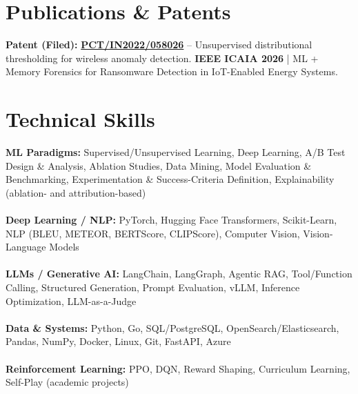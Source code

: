 \documentclass[letterpaper,11pt]{article}
\begin{document}
\section{Publications \& Patents}
\resumeSubHeadingListStart
\resumeProjectHeading
{\textbf{Patent (Filed):} \href{https://patents.justia.com/inventor/vedaang-chopra}{\textbf{PCT/IN2022/058026}} -- Unsupervised distributional thresholding for wireless anomaly detection.}{}
\resumeProjectHeading
{\textbf{IEEE ICAIA 2026} \;|\; ML + Memory Forensics for Ransomware Detection in IoT-Enabled Energy Systems.}{}
\resumeSubHeadingListEnd

\section{Technical Skills}
\footnotesize
\textbf{ML Paradigms:} Supervised/Unsupervised Learning, Deep Learning, A/B Test Design \& Analysis, Ablation
Studies, Data Mining, Model Evaluation \& Benchmarking, Experimentation \& Success-Criteria Definition,
Explainability (ablation- and attribution-based) \\\\[1pt]
\textbf{Deep Learning / NLP:} PyTorch, Hugging Face Transformers, Scikit-Learn, NLP (BLEU, METEOR,
BERTScore, CLIPScore), Computer Vision, Vision-Language Models \\\\[1pt]
\textbf{LLMs / Generative AI:} LangChain, LangGraph, Agentic RAG, Tool/Function Calling, Structured Generation,
Prompt Evaluation, vLLM, Inference Optimization, LLM-as-a-Judge \\\\[1pt]
\textbf{Data \& Systems:} Python, Go, SQL/PostgreSQL, OpenSearch/Elasticsearch, Pandas, NumPy,
Docker, Linux, Git, FastAPI, Azure \\\\[1pt]
\textbf{Reinforcement Learning:} PPO, DQN, Reward Shaping, Curriculum Learning, Self-Play (academic projects)
\end{document}
